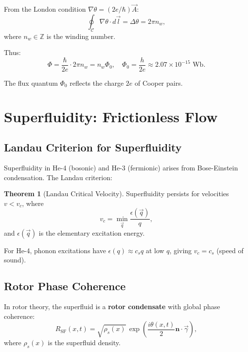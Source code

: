\documentclass[12pt,a4paper]{article}
\theoremstyle{definition}
\newtheorem{theorem}{Theorem}[section]
\theoremstyle{remark}
\begin{document}
From the London condition $\nabla \theta = (2e/\hbar) \vec{A}$:
\begin{equation}
\oint_{\mathcal{C}} \nabla \theta \cdot d\vec{l} = \Delta \theta = 2\pi n_w,
\end{equation}
where $n_w \in \mathbb{Z}$ is the winding number.

Thus:
\begin{equation}
\Phi = \frac{\hbar}{2e} \cdot 2\pi n_w = n_w \Phi_0, \quad \Phi_0 = \frac{h}{2e} \approx 2.07 \times 10^{-15} \text{ Wb}.
\end{equation}

The flux quantum $\Phi_0$ reflects the charge $2e$ of Cooper pairs.

\section{Superfluidity: Frictionless Flow}

\subsection{Landau Criterion for Superfluidity}

Superfluidity in He-4 (bosonic) and He-3 (fermionic) arises from Bose-Einstein condensation. The Landau criterion:

\begin{theorem}[Landau Critical Velocity]
Superfluidity persists for velocities $v < v_c$, where
\begin{equation}
v_c = \min_{\vec{q}} \frac{\epsilon(\vec{q})}{q},
\end{equation}
and $\epsilon(\vec{q})$ is the elementary excitation energy.
\end{theorem}

For He-4, phonon excitations have $\epsilon(q) \approx c_s q$ at low $q$, giving $v_c = c_s$ (speed of sound).

\subsection{Rotor Phase Coherence}

In rotor theory, the superfluid is a \textbf{rotor condensate} with global phase coherence:
\begin{equation}
R_{\text{SF}}(x,t) = \sqrt{\rho_s(x)} \, \exp\left(\frac{i\theta(x,t)}{2} \mathbf{n} \cdot \vec{\gamma}\right),
\end{equation}
where $\rho_s(x)$ is the superfluid density.
\end{document}

